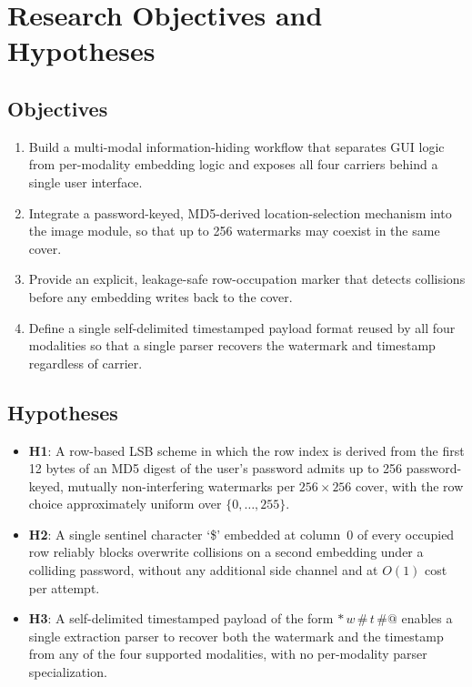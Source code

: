 \section{Research Objectives and Hypotheses}

\subsection*{Objectives}

\begin{enumerate}[label=\textbf{O\arabic*.}]
    \item Build a multi-modal information-hiding workflow that separates GUI logic from per-modality embedding logic and exposes all four carriers behind a single user interface.
    \item Integrate a password-keyed, MD5-derived location-selection mechanism into the image module, so that up to 256 watermarks may coexist in the same cover.
    \item Provide an explicit, leakage-safe row-occupation marker that detects collisions before any embedding writes back to the cover.
    \item Define a single self-delimited timestamped payload format reused by all four modalities so that a single parser recovers the watermark and timestamp regardless of carrier.
\end{enumerate}

\subsection*{Hypotheses}

\begin{itemize}
    \item \textbf{H1}: A row-based LSB scheme in which the row index is derived from the first 12 bytes of an MD5 digest of the user's password admits up to 256 password-keyed, mutually non-interfering watermarks per $256 \times 256$ cover, with the row choice approximately uniform over $\{0, \ldots, 255\}$.
    \item \textbf{H2}: A single sentinel character `\$' embedded at column~0 of every occupied row reliably blocks overwrite collisions on a second embedding under a colliding password, without any additional side channel and at $O(1)$ cost per attempt.
    \item \textbf{H3}: A self-delimited timestamped payload of the form $\texttt{*}\,w\,\texttt{\#}\,t\,\texttt{\#@}$ enables a single extraction parser to recover both the watermark and the timestamp from any of the four supported modalities, with no per-modality parser specialization.
\end{itemize}

